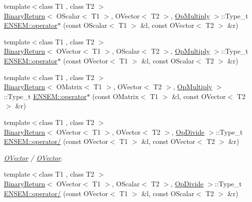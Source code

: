 \begin{DoxyCompactItemize}
\item 
{\footnotesize template$<$class T1 , class T2 $>$ }\\\mbox{\hyperlink{structBinaryReturn}{Binary\+Return}}$<$ O\+Scalar$<$ T1 $>$, O\+Vector$<$ T2 $>$, \mbox{\hyperlink{structOpMultiply}{Op\+Multiply}} $>$\+::Type\+\_\+t \mbox{\hyperlink{group__obsvector_ga8b90f37dfc2d857d5ba547b2639cc97e}{E\+N\+S\+E\+M\+::operator$\ast$}} (const O\+Scalar$<$ T1 $>$ \&l, const O\+Vector$<$ T2 $>$ \&r)
\item 
{\footnotesize template$<$class T1 , class T2 $>$ }\\\mbox{\hyperlink{structBinaryReturn}{Binary\+Return}}$<$ O\+Vector$<$ T1 $>$, O\+Scalar$<$ T2 $>$, \mbox{\hyperlink{structOpMultiply}{Op\+Multiply}} $>$\+::Type\+\_\+t \mbox{\hyperlink{group__obsvector_gabb4c9b103a03a23a7cc8db755ded0b7c}{E\+N\+S\+E\+M\+::operator$\ast$}} (const O\+Vector$<$ T1 $>$ \&l, const O\+Scalar$<$ T2 $>$ \&r)
\item 
{\footnotesize template$<$class T1 , class T2 $>$ }\\\mbox{\hyperlink{structBinaryReturn}{Binary\+Return}}$<$ O\+Matrix$<$ T1 $>$, O\+Vector$<$ T2 $>$, \mbox{\hyperlink{structOpMultiply}{Op\+Multiply}} $>$\+::Type\+\_\+t \mbox{\hyperlink{group__obsvector_ga7ba413a9121973912be1ff1686cec922}{E\+N\+S\+E\+M\+::operator$\ast$}} (const O\+Matrix$<$ T1 $>$ \&l, const O\+Vector$<$ T2 $>$ \&r)
\item 
{\footnotesize template$<$class T1 , class T2 $>$ }\\\mbox{\hyperlink{structBinaryReturn}{Binary\+Return}}$<$ O\+Vector$<$ T1 $>$, O\+Vector$<$ T2 $>$, \mbox{\hyperlink{structOpDivide}{Op\+Divide}} $>$\+::Type\+\_\+t \mbox{\hyperlink{group__obsvector_ga85053dcc452aa903b53e9b24dc0d5fb9}{E\+N\+S\+E\+M\+::operator/}} (const O\+Vector$<$ T1 $>$ \&l, const O\+Vector$<$ T2 $>$ \&r)
\begin{DoxyCompactList}\small\item\em \mbox{\hyperlink{classENSEM_1_1OVector}{O\+Vector}} / \mbox{\hyperlink{classENSEM_1_1OVector}{O\+Vector}}. \end{DoxyCompactList}\item 
{\footnotesize template$<$class T1 , class T2 $>$ }\\\mbox{\hyperlink{structBinaryReturn}{Binary\+Return}}$<$ O\+Vector$<$ T1 $>$, O\+Scalar$<$ T2 $>$, \mbox{\hyperlink{structOpDivide}{Op\+Divide}} $>$\+::Type\+\_\+t \mbox{\hyperlink{group__obsvector_ga7000d5ea0ebcbe74abe855326d6e82cd}{E\+N\+S\+E\+M\+::operator/}} (const O\+Vector$<$ T1 $>$ \&l, const O\+Scalar$<$ T2 $>$ \&r)

\end{DoxyCompactItemize}
